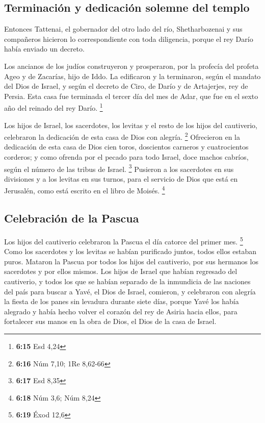 \hypertarget{terminaciuxf3n-y-dedicaciuxf3n-solemne-del-templo}{%
\subsection{Terminación y dedicación solemne del
templo}\label{terminaciuxf3n-y-dedicaciuxf3n-solemne-del-templo}}

 Entonces Tattenai, el gobernador del otro lado del río,
Shetharbozenai y sus compañeros hicieron lo correspondiente con toda
diligencia, porque el rey Darío había enviado un decreto.

 Los ancianos de los judíos construyeron y prosperaron,
por la profecía del profeta Ageo y de Zacarías, hijo de Iddo. La
edificaron y la terminaron, según el mandato del Dios de Israel, y según
el decreto de Ciro, de Darío y de Artajerjes, rey de Persia.
 Esta casa fue terminada el tercer día del mes de Adar,
que fue en el sexto año del reinado del rey Darío. \footnote{\textbf{6:15}
  Esd 4,24}

 Los hijos de Israel, los sacerdotes, los levitas y el
resto de los hijos del cautiverio, celebraron la dedicación de esta casa
de Dios con alegría. \footnote{\textbf{6:16} Núm 7,10; 1Re 8,62-66}
 Ofrecieron en la dedicación de esta casa de Dios cien
toros, doscientos carneros y cuatrocientos corderos; y como ofrenda por
el pecado para todo Israel, doce machos cabríos, según el número de las
tribus de Israel. \footnote{\textbf{6:17} Esd 8,35} 
Pusieron a los sacerdotes en sus divisiones y a los levitas en sus
turnos, para el servicio de Dios que está en Jerusalén, como está
escrito en el libro de Moisés. \footnote{\textbf{6:18} Núm 3,6; Núm 8,24}

\hypertarget{celebraciuxf3n-de-la-pascua}{%
\subsection{Celebración de la
Pascua}\label{celebraciuxf3n-de-la-pascua}}

 Los hijos del cautiverio celebraron la Pascua el día
catorce del primer mes. \footnote{\textbf{6:19} Éxod 12,6}
 Como los sacerdotes y los levitas se habían purificado
juntos, todos ellos estaban puros. Mataron la Pascua por todos los hijos
del cautiverio, por sus hermanos los sacerdotes y por ellos mismos.
 Los hijos de Israel que habían regresado del cautiverio,
y todos los que se habían separado de la inmundicia de las naciones del
país para buscar a Yavé, el Dios de Israel, comieron,  y
celebraron con alegría la fiesta de los panes sin levadura durante siete
días, porque Yavé los había alegrado y había hecho volver el corazón del
rey de Asiria hacia ellos, para fortalecer sus manos en la obra de Dios,
el Dios de la casa de Israel.

